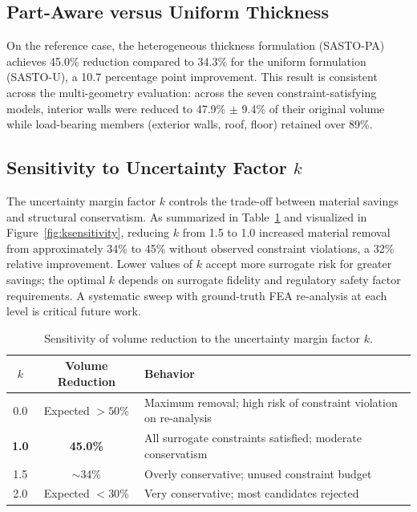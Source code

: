 \documentclass[11pt]{article}
\theoremstyle{plain}
\theoremstyle{definition}
\theoremstyle{remark}
\begin{document}
\subsection{Part-Aware versus Uniform Thickness}

On the reference case, the heterogeneous thickness formulation (SASTO-PA) achieves 45.0\% reduction compared to 34.3\% for the uniform formulation (SASTO-U), a 10.7 percentage point improvement. This result is consistent across the multi-geometry evaluation: across the seven constraint-satisfying models, interior walls were reduced to 47.9\% $\pm$ 9.4\% of their original volume while load-bearing members (exterior walls, roof, floor) retained over 89\%.

\subsection{Sensitivity to Uncertainty Factor $k$}
\label{sec:k_sensitivity}

The uncertainty margin factor $k$ controls the trade-off between material savings and structural conservatism. As summarized in Table~\ref{tab:ksensitivity} and visualized in Figure~\ref{fig:ksensitivity}, reducing $k$ from 1.5 to 1.0 increased material removal from approximately 34\% to 45\% without observed constraint violations, a 32\% relative improvement. Lower values of $k$ accept more surrogate risk for greater savings; the optimal $k$ depends on surrogate fidelity and regulatory safety factor requirements. A systematic sweep with ground-truth FEA re-analysis at each level is critical future work.

\begin{table}[t]
\centering
\caption{Sensitivity of volume reduction to the uncertainty margin factor $k$.}
\label{tab:ksensitivity}
\small
\begin{tabular}{@{}ccl@{}}
\toprule
$k$ & \textbf{Volume Reduction} & \textbf{Behavior} \\
\midrule
0.0 & Expected $>50\%$ & Maximum removal; high risk of constraint violation on re-analysis \\
\textbf{1.0} & \textbf{45.0\%} & All surrogate constraints satisfied; moderate conservatism \\
1.5 & $\sim$34\% & Overly conservative; unused constraint budget \\
2.0 & Expected $<30\%$ & Very conservative; most candidates rejected \\
\bottomrule
\end{tabular}
\end{table}
\end{document}
